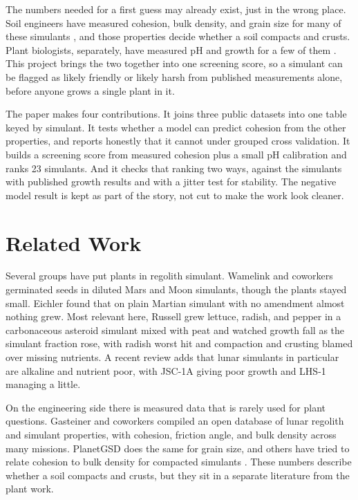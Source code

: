 \documentclass[conference,letterpaper,10pt]{IEEEtran}
\begin{document}
The numbers needed for a first guess may already exist, just in the wrong place. Soil engineers have measured cohesion, bulk density, and grain size for many of these simulants \cite{gasteiner,planetgsd}, and those properties decide whether a soil compacts and crusts. Plant biologists, separately, have measured pH and growth for a few of them \cite{russell}. This project brings the two together into one screening score, so a simulant can be flagged as likely friendly or likely harsh from published measurements alone, before anyone grows a single plant in it.

The paper makes four contributions. It joins three public datasets into one table keyed by simulant. It tests whether a model can predict cohesion from the other properties, and reports honestly that it cannot under grouped cross validation. It builds a screening score from measured cohesion plus a small pH calibration and ranks 23 simulants. And it checks that ranking two ways, against the simulants with published growth results and with a jitter test for stability. The negative model result is kept as part of the story, not cut to make the work look cleaner.

\section{Related Work}
Several groups have put plants in regolith simulant. Wamelink and coworkers \cite{wamelink} germinated seeds in diluted Mars and Moon simulants, though the plants stayed small. Eichler \cite{eichler} found that on plain Martian simulant with no amendment almost nothing grew. Most relevant here, Russell \cite{russell} grew lettuce, radish, and pepper in a carbonaceous asteroid simulant mixed with peat and watched growth fall as the simulant fraction rose, with radish worst hit and compaction and crusting blamed over missing nutrients. A recent review \cite{duri} adds that lunar simulants in particular are alkaline and nutrient poor, with JSC-1A giving poor growth and LHS-1 managing a little.

On the engineering side there is measured data that is rarely used for plant questions. Gasteiner and coworkers \cite{gasteiner} compiled an open database of lunar regolith and simulant properties, with cohesion, friction angle, and bulk density across many missions. PlanetGSD \cite{planetgsd} does the same for grain size, and others have tried to relate cohesion to bulk density for compacted simulants \cite{dotson}. These numbers describe whether a soil compacts and crusts, but they sit in a separate literature from the plant work.
\end{document}
